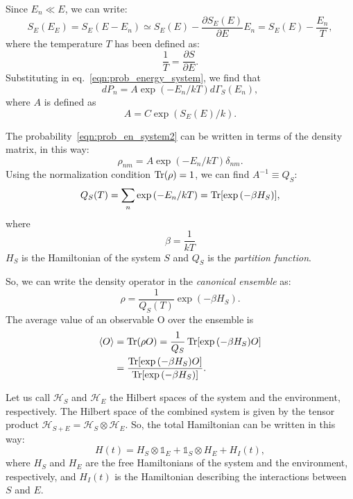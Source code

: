Since $E_n \ll E$, we can write:
\begin{equation*}
    S_E(E_E) = S_E (E-E_n) \simeq S_E(E) - \frac{\partial S_E(E)}{\partial E} E_n = S_E(E) -\frac{E_n}{T},
\end{equation*}
where the temperature $T$ has been defined as:
\begin{equation*}
    \frac{1}{T} = \frac{\partial S}{\partial E}.
\end{equation*}
Substituting in eq.~\ref{eqn:prob_energy_system}, we find that
\begin{equation}
\label{eqn:prob_en_system2}
    dP_n = A \exp{(-E_n/kT)} d\Gamma_S(E_n),
\end{equation}
where $A$ is defined as
\begin{equation}
    A = C \exp{(S_E(E)/k)}.
\end{equation}

The probability~\ref{eqn:prob_en_system2} can be written in terms of the density matrix, in this way:
\begin{equation*}
    \rho_{nm} = A \exp{(-E_n/kT)} \delta_{nm}.
\end{equation*}
Using the normalization condition $\operatorname{Tr}(\rho) = 1$, we can find $A^{-1} \equiv Q_S$:
\begin{equation*}
    Q_S(T) = \sum_n \exp{(-E_n/kT)} = \operatorname{Tr}[\exp{(-\beta H_S)}],
\end{equation*}
where
\begin{equation*}
    \beta = \frac{1}{kT}
\end{equation*}
$H_S$ is the Hamiltonian of the system $S$ and $Q_S$ is the \emph{partition function}.

So, we can write the density operator in the \emph{canonical ensemble} as:
\begin{equation}
    \rho = \frac{1}{Q_S(T)} \exp{(-\beta H_S)}.
\end{equation}
The average value of an observable O over the ensemble is 
\begin{equation}
\begin{split}
    \langle O \rangle &= \operatorname{Tr}(\rho O) = \frac{1}{Q_S} \operatorname{Tr}[\exp{(-\beta H_S)}O] \\
                      &= \frac{\operatorname{Tr}[\exp{(-\beta H_S)}O]}{\operatorname{Tr}[\exp{(-\beta H_S)}]}.
\end{split}
\end{equation}

Let us call $\mathcal{H}_S$ and $\mathcal{H}_E$ the Hilbert spaces of the system and the environment, respectively. The Hilbert space of the combined system is given by the tensor product $\mathcal{H}_{S+E} = \mathcal{H}_S \otimes \mathcal{H}_E$. So, the total Hamiltonian can be written in this way:
\begin{equation}
    H(t) = H_S \otimes \mathds{1}_E + \mathds{1}_S \otimes H_E + H_I(t),
\end{equation}
where $H_S$ and $H_E$ are the free Hamiltonians of the system and the environment, respectively, and $H_I(t)$ is the Hamiltonian describing the interactions between $S$ and $E$.


